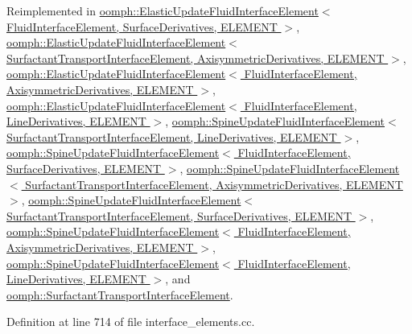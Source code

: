Reimplemented in \hyperlink{classoomph_1_1ElasticUpdateFluidInterfaceElement_a10b64a463b5ff98475e727b06d95b0ac}{oomph\+::\+Elastic\+Update\+Fluid\+Interface\+Element$<$ Fluid\+Interface\+Element, Surface\+Derivatives, E\+L\+E\+M\+E\+N\+T $>$}, \hyperlink{classoomph_1_1ElasticUpdateFluidInterfaceElement_a10b64a463b5ff98475e727b06d95b0ac}{oomph\+::\+Elastic\+Update\+Fluid\+Interface\+Element$<$ Surfactant\+Transport\+Interface\+Element, Axisymmetric\+Derivatives, E\+L\+E\+M\+E\+N\+T $>$}, \hyperlink{classoomph_1_1ElasticUpdateFluidInterfaceElement_a10b64a463b5ff98475e727b06d95b0ac}{oomph\+::\+Elastic\+Update\+Fluid\+Interface\+Element$<$ Fluid\+Interface\+Element, Axisymmetric\+Derivatives, E\+L\+E\+M\+E\+N\+T $>$}, \hyperlink{classoomph_1_1ElasticUpdateFluidInterfaceElement_a10b64a463b5ff98475e727b06d95b0ac}{oomph\+::\+Elastic\+Update\+Fluid\+Interface\+Element$<$ Fluid\+Interface\+Element, Line\+Derivatives, E\+L\+E\+M\+E\+N\+T $>$}, \hyperlink{classoomph_1_1SpineUpdateFluidInterfaceElement_af876d90d19b6faa253260193ded3f175}{oomph\+::\+Spine\+Update\+Fluid\+Interface\+Element$<$ Surfactant\+Transport\+Interface\+Element, Line\+Derivatives, E\+L\+E\+M\+E\+N\+T $>$}, \hyperlink{classoomph_1_1SpineUpdateFluidInterfaceElement_af876d90d19b6faa253260193ded3f175}{oomph\+::\+Spine\+Update\+Fluid\+Interface\+Element$<$ Fluid\+Interface\+Element, Surface\+Derivatives, E\+L\+E\+M\+E\+N\+T $>$}, \hyperlink{classoomph_1_1SpineUpdateFluidInterfaceElement_af876d90d19b6faa253260193ded3f175}{oomph\+::\+Spine\+Update\+Fluid\+Interface\+Element$<$ Surfactant\+Transport\+Interface\+Element, Axisymmetric\+Derivatives, E\+L\+E\+M\+E\+N\+T $>$}, \hyperlink{classoomph_1_1SpineUpdateFluidInterfaceElement_af876d90d19b6faa253260193ded3f175}{oomph\+::\+Spine\+Update\+Fluid\+Interface\+Element$<$ Surfactant\+Transport\+Interface\+Element, Surface\+Derivatives, E\+L\+E\+M\+E\+N\+T $>$}, \hyperlink{classoomph_1_1SpineUpdateFluidInterfaceElement_af876d90d19b6faa253260193ded3f175}{oomph\+::\+Spine\+Update\+Fluid\+Interface\+Element$<$ Fluid\+Interface\+Element, Axisymmetric\+Derivatives, E\+L\+E\+M\+E\+N\+T $>$}, \hyperlink{classoomph_1_1SpineUpdateFluidInterfaceElement_af876d90d19b6faa253260193ded3f175}{oomph\+::\+Spine\+Update\+Fluid\+Interface\+Element$<$ Fluid\+Interface\+Element, Line\+Derivatives, E\+L\+E\+M\+E\+N\+T $>$}, and \hyperlink{classoomph_1_1SurfactantTransportInterfaceElement_ad41354dbe1ae8291e3330b3752b525f8}{oomph\+::\+Surfactant\+Transport\+Interface\+Element}.



Definition at line 714 of file interface\+\_\+elements.\+cc.



